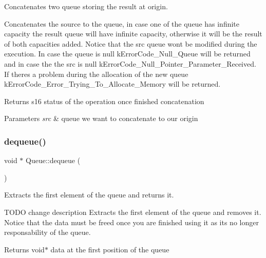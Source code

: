 Concatenates two queue storing the result at origin. 

Concatenates the source to the queue, in case one of the queue has infinite capacity the result queue will have infinite capacity, otherwise it will be the result of both capacities added. Notice that the src queue won\textquotesingle{}t be modified during the execution. In case the queue is null k\+Error\+Code\+\_\+\+Null\+\_\+\+Queue will be returned and in case the the src is null k\+Error\+Code\+\_\+\+Null\+\_\+\+Pointer\+\_\+\+Parameter\+\_\+\+Received. If there\textquotesingle{}s a problem during the allocation of the new queue k\+Error\+Code\+\_\+\+Error\+\_\+\+Trying\+\_\+\+To\+\_\+\+Allocate\+\_\+\+Memory will be returned.

\begin{DoxyReturn}{Returns}
s16 status of the operation once finished concatenation 
\end{DoxyReturn}

\begin{DoxyParams}{Parameters}
{\em src} & queue we want to concatenate to our origin \\
\hline
\end{DoxyParams}
\mbox{\label{class_queue_a30c82e655d4420c27ef5e4ce17fa99e8}} 
\subsubsection{\texorpdfstring{dequeue()}{dequeue()}}
{\footnotesize\ttfamily void $\ast$ Queue\+::dequeue (\begin{DoxyParamCaption}{ }\end{DoxyParamCaption})}



Extracts the first element of the queue and returns it. 

T\+O\+DO change description Extracts the first element of the queue and removes it. Notice that the data must be freed once you are finished using it as it\textquotesingle{}s no longer responsability of the queue.

\begin{DoxyReturn}{Returns}
void$\ast$ data at the first position of the queue 
\end{DoxyReturn}
\mbox{\label{class_queue_a27a37b0757acf0a4eeee469dd3ab5af9}} 
